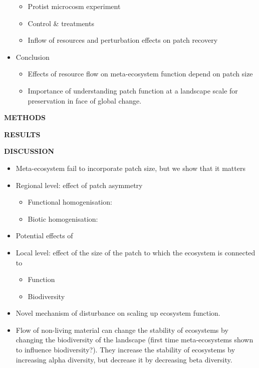 \documentclass[
]{article}
\begin{document}
\begin{itemize}
  \begin{itemize}
  \item
    Protist microcosm experiment
  \item
    Control \& treatments
  \item
    Inflow of resources and perturbation effects on patch recovery
  \end{itemize}
\item
  Conclusion

  \begin{itemize}
  \item
    Effects of resource flow on meta-ecosystem function depend on patch
    size
  \item
    Importance of understanding patch function at a landscape scale for
    preservation in face of global change.
  \end{itemize}
\end{itemize}

\textbf{METHODS}

\textbf{RESULTS}

\textbf{DISCUSSION}

\begin{itemize}
\item
  Meta-ecosystem fail to incorporate patch size, but we show that it
  matters
\item
  Regional level: effect of patch asymmetry

  \begin{itemize}
  \item
    Functional homogenisation:
  \item
    Biotic homogenisation:
  \end{itemize}
\item
  Potential effects of
\item
  Local level: effect of the size of the patch to which the ecosystem is
  connected to

  \begin{itemize}
  \item
    Function
  \item
    Biodiversity
  \end{itemize}
\item
  Novel mechanism of disturbance on scaling up ecosystem function.
\item
  Flow of non-living material can change the stability of ecosystems by
  changing the biodiversity of the landscape (first time meta-ecosystems
  shown to influence biodiversity?). They increase the stability of
  ecosystems by increasing alpha diversity, but decrease it by
  decreasing beta diversity.
\end{itemize}
\end{document}
